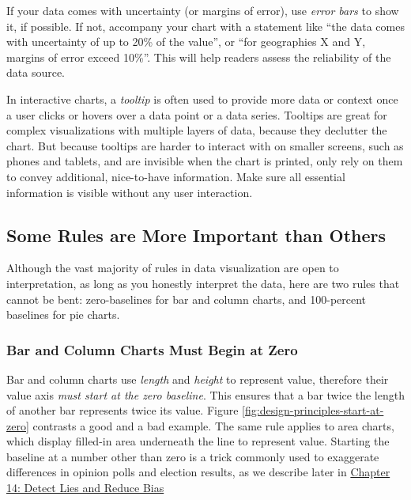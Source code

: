 \documentclass[
  english,
]{book}
\begin{document}
If your data comes with uncertainty (or margins of error), use \emph{error bars} to show it, if possible.
If not, accompany your chart with a statement like ``the data comes with uncertainty of up to 20\% of the value'',
or ``for geographies X and Y, margins of error exceed 10\%''. This will help readers assess the reliability of the data source.

In interactive charts, a \emph{tooltip} is often used to provide more data or context
once a user clicks or hovers over a data point or a data series.
Tooltips are great for complex visualizations with multiple layers of data,
because they declutter the chart. But because tooltips are harder to interact with on smaller screens,
such as phones and tablets, and are invisible when the chart is printed, only rely on them to convey
additional, nice-to-have information. Make sure all essential information
is visible without any user interaction.

\hypertarget{some-rules-are-more-important-than-others}{%
\subsection*{Some Rules are More Important than Others}\label{some-rules-are-more-important-than-others}}

Although the vast majority of rules in data visualization are open to interpretation, as long as you honestly interpret the data, here are two rules that cannot be bent: zero-baselines for bar and column charts, and 100-percent baselines for pie charts.

\hypertarget{bar-and-column-charts-must-begin-at-zero}{%
\subsubsection*{Bar and Column Charts Must Begin at Zero}\label{bar-and-column-charts-must-begin-at-zero}}

Bar and column charts use \emph{length} and \emph{height} to represent value, therefore their value axis \emph{must start at the zero baseline}. This ensures that a bar twice the length of another bar represents twice its value. Figure \ref{fig:design-principles-start-at-zero} contrasts a good and a bad example. The same rule applies to area charts, which display filled-in area underneath the line to represent value. Starting the baseline at a number other than zero is a trick commonly used to exaggerate differences in opinion polls and election results, as we describe later in \href{detect.html}{Chapter 14: Detect Lies and Reduce Bias}
\end{document}
